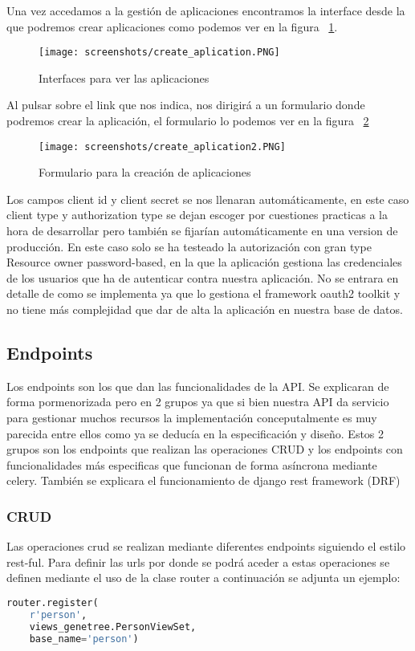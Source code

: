 Una vez accedamos a la gestión de aplicaciones encontramos la interface desde la que podremos crear aplicaciones como podemos ver en la figura ~\ref{fig:create_aplication}.
\begin{figure}[ht!]
\center
\texttt{[image: screenshots/create\_aplication.PNG]}
\caption{Interfaces para ver las aplicaciones}
\label{fig:create_aplication}
\end{figure}

Al pulsar sobre el link que nos indica, nos dirigirá a un formulario donde podremos crear la aplicación, el formulario lo podemos ver en la figura ~\ref{fig:create_aplication2}
\begin{figure}[ht!]
\center
\texttt{[image: screenshots/create\_aplication2.PNG]}
\caption{Formulario para la creación de aplicaciones}
\label{fig:create_aplication2}
\end{figure}

Los campos client id y client secret se nos llenaran automáticamente, en este caso client type y authorization type se dejan escoger por cuestiones practicas a la hora de desarrollar pero también se fijarían automáticamente en una version de producción. En este caso solo se ha testeado la autorización con gran type Resource owner password-based, en la que la aplicación gestiona las credenciales de los usuarios que ha de autenticar contra nuestra aplicación. No se entrara en detalle de como se implementa ya que lo gestiona el framework oauth2 toolkit y no tiene más complejidad que dar de alta la aplicación en nuestra base de datos.

\subsection{Endpoints}
Los endpoints son los que dan las funcionalidades de la API. Se explicaran de forma pormenorizada pero en 2 grupos ya que si bien nuestra API da servicio para gestionar muchos recursos la implementación conceputalmente es muy parecida entre ellos como ya se deducía en la especificación y diseño. Estos 2 grupos son los endpoints que realizan las operaciones CRUD y los endpoints con funcionalidades más especificas que funcionan de forma asíncrona mediante celery. También se explicara el funcionamiento de django rest framework (DRF)

\subsubsection{CRUD}
Las operaciones crud se realizan mediante diferentes endpoints siguiendo el estilo rest-ful. Para definir las urls por donde se podrá aceder a estas operaciones se definen mediante el uso de la clase router a continuación se adjunta un ejemplo:
\begin{lstlisting}[language=python]
router.register(
    r'person',
    views_genetree.PersonViewSet,
    base_name='person')
\end{lstlisting}

